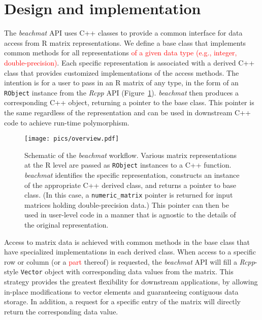 \documentclass[10pt,letterpaper]{article}
\newcommand{\beachmat}{\textit{beachmat}}
\newcommand{\code}[1]{\texttt{#1}}
\newcommand{\revised}[1]{\textcolor{red}{#1}}
\begin{document}
\section*{Design and implementation}
The \beachmat{} API uses C++ classes to provide a common interface for data access from R matrix representations.
We define a base class that implements common methods for all representations \revised{of a given data type (e.g., integer, double-precision)}.
Each specific representation is associated with a derived C++ class that provides customized implementations of the access methods.
The intention is for a user to pass in an R matrix of any type, in the form of an \code{RObject} instance from the \textit{Rcpp} API (Figure~\ref{fig:beachoverview}).
\beachmat{} then produces a corresponding C++ object, returning a pointer to the base class.
This pointer is the same regardless of the representation and can be used in downstream C++ code to achieve run-time polymorphism.

\begin{figure}[btp]
    \begin{center}
        \texttt{[image: pics/overview.pdf]}
    \end{center}
    \caption{Schematic of the \beachmat{} workflow.
        Various matrix representations at the R level are passed as \code{RObject} instances to a C++ function.
        \beachmat{} identifies the specific representation, constructs an instance of the appropriate C++ derived class, and returns a pointer to base class.
        (In this case, a \code{numeric\_matrix} pointer is returned for input matrices holding double-precision data.)
        This pointer can then be used in user-level code in a manner that is agnostic to the details of the original representation.
    }
    \label{fig:beachoverview}
\end{figure}

Access to matrix data is achieved with common methods in the base class that have specialized implementations in each derived class. 
When access to a specific row or column (or a \revised{part} thereof) is requested, the \beachmat{} API will fill a \textit{Rcpp}-style \code{Vector} object with corresponding data values from the matrix.
This strategy provides the greatest flexibility for downstream applications, by allowing in-place modifications to vector elements and guaranteeing contiguous data storage. 
In addition, a request for a specific entry of the matrix will directly return the corresponding data value.
\end{document}
